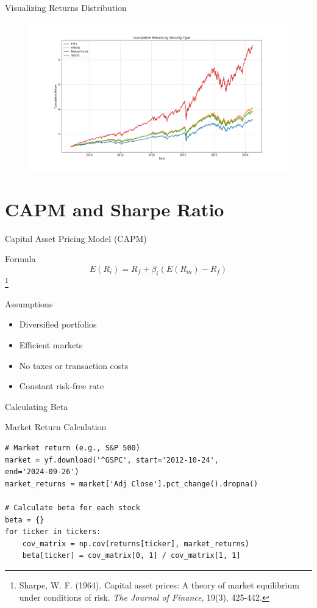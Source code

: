 \documentclass{beamer}
\begin{document}
\begin{frame}[fragile]{Visualizing Returns Distribution}
        \begin{figure}
            \centering
            \includegraphics[width=\textwidth]{cumulative_returns_by_type.png}
        \end{figure}
\end{frame}

\section{CAPM and Sharpe Ratio}
\begin{frame}{Capital Asset Pricing Model (CAPM)}
    \begin{block}{Formula} 
        \begin{equation*}
            E(R_i) = R_f + \beta_i (E(R_m) - R_f)
        \end{equation*}
        \footnote{Sharpe, W. F. (1964). Capital asset prices: A theory of market equilibrium under conditions of risk. \textit{The Journal of Finance}, 19(3), 425-442.}
    \end{block}
    \begin{block}{Assumptions}
        \begin{itemize}
            \item Diversified portfolios
            \item Efficient markets
            \item No taxes or transaction costs
            \item Constant risk-free rate
        \end{itemize}
    \end{block}
\end{frame}

\begin{frame}[fragile]{Calculating Beta}
    \begin{block}{Market Return Calculation}
        \begin{verbatim}
# Market return (e.g., S&P 500)
market = yf.download('^GSPC', start='2012-10-24', 
end='2024-09-26')
market_returns = market['Adj Close'].pct_change().dropna()

# Calculate beta for each stock
beta = {}
for ticker in tickers:
    cov_matrix = np.cov(returns[ticker], market_returns)
    beta[ticker] = cov_matrix[0, 1] / cov_matrix[1, 1]
        \end{verbatim}
    \end{block}
\end{frame}
\end{document}
